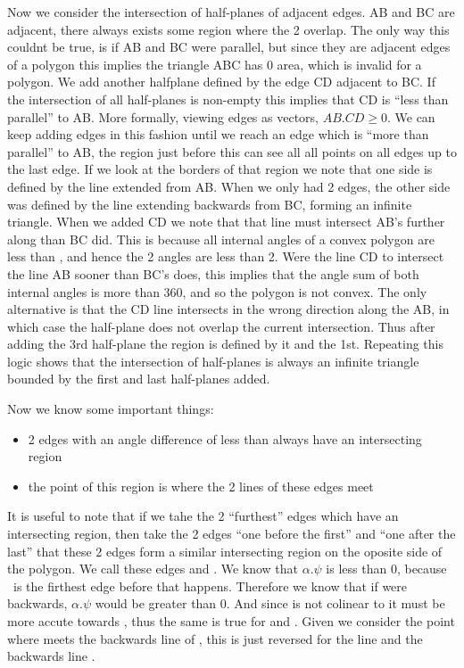 Now we consider the intersection of half-planes of adjacent edges.
AB and BC are adjacent, there always exists some region where the 2 overlap.
The only way this couldnt be true, is if AB and BC were parallel, but since they are adjacent edges of a polygon this implies the triangle ABC has 0 area, which is invalid for a polygon.
We add another halfplane defined by the edge CD adjacent to BC.
If the intersection of all half-planes is non-empty this implies that CD is ``less than parallel'' to AB.
More formally, viewing edges as vectors, $AB.CD \geq 0$.
We can keep adding edges in this fashion until we reach an edge which is ``more than parallel'' to AB, the region just before this can see all all points on all edges up to the last edge.
If we look at the borders of that region we note that one side is defined by the line extended from AB.
When we only had 2 edges, the other side was defined by the line extending backwards from BC, forming an infinite triangle.
When we added CD we note that that line must intersect AB's further along than BC did.
This is because all internal angles of a convex polygon are less than \pi, and hence the 2 angles are less than 2\pi.
Were the line CD to intersect the line AB sooner than BC's does, this implies that the angle sum of both internal angles is more than 360, and so the polygon is not convex.
The only alternative is that the CD line intersects in the wrong direction along the AB, in which case the half-plane does not overlap the current intersection.
Thus after adding the 3rd half-plane the region is defined by it and the 1st.
Repeating this logic shows that the intersection of half-planes is always an infinite triangle bounded by the first and last half-planes added.

Now we know some important things:
\begin{itemize}
	\item 2 edges with an angle difference of less than \pi always have an intersecting region
	\item the point of this region is where the 2 lines of these edges meet
\end{itemize}
It is useful to note that if we tahe the 2 ``furthest'' edges which have an intersecting region, then take the 2 edges ``one before the first'' and ``one after the last'' that these 2 edges form a similar intersecting region on the oposite side of the polygon.
We call these edges \alpha \beta and \psi \omega.
We know that $\alpha . \psi$ is less than 0, because \beta\ is the firthest edge before that happens.
Therefore we know that if \alpha were backwards, $\alpha . \psi$ would be greater than 0.
And since \omega is not colinear to \alpha it must be more accute towards \psi, thus the same is true for \psi and \omega.
Given we consider the point where \alpha meets the backwards line of \beta, this is just reversed for the line \psi and the backwards line \omega.

